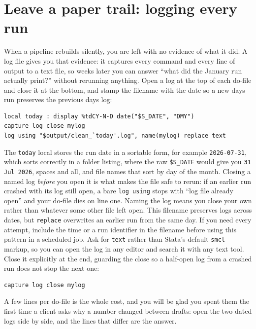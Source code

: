 \documentclass[
    a4paper,
    fontsize=10pt,
    twoside=true,
    numbers=noenddot,
]{kaobook}
\begin{document}
\section{Leave a paper trail: logging every run}\label{sec:logging}
When a pipeline rebuilds silently, you are left with no evidence of what it did. A log file gives you that evidence: it captures every command and every line of output to a text file, so weeks later you can answer \enquote{what did the January run actually print?} without rerunning anything. Open a log at the top of each do-file and close it at the bottom, and stamp the filename with the date so a new day\textquotesingle s run preserves the previous day\textquotesingle s log:
\par
{\footnotesize
\begin{verbatim}
local today : display %tdCY-N-D date("$S_DATE", "DMY")
capture log close mylog
log using "$output/clean_`today'.log", name(mylog) replace text
\end{verbatim}
}
The \texttt{today} local stores the run date in a sortable form, for example \texttt{2026-07-31}, which sorts correctly in a folder listing, where the raw \texttt{\$S\_DATE} would give you \texttt{31 Jul 2026}, spaces and all, and file names that sort by day of the month. Closing a named log \emph{before} you open it is what makes the file safe to rerun: if an earlier run crashed with its log still open, a bare \texttt{log using} stops with \enquote{log file already open} and your do-file dies on line one. Naming the log means you close your own rather than whatever some other file left open. This filename preserves logs across dates, but \texttt{replace} overwrites an earlier run from the same day. If you need every attempt, include the time or a run identifier in the filename before using this pattern in a scheduled job. Ask for \texttt{text} rather than Stata's default \texttt{smcl} markup, so you can open the log in any editor and search it with any text tool. Close it explicitly at the end, guarding the close so a half-open log from a crashed run does not stop the next one:
\par
{\footnotesize
\begin{verbatim}
capture log close mylog
\end{verbatim}
}
A few lines per do-file is the whole cost, and you will be glad you spent them the first time a client asks why a number changed between drafts: open the two dated logs side by side, and the lines that differ are the answer.
\end{document}
